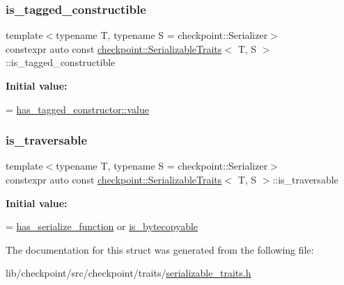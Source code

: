 \subsubsection{\texorpdfstring{is\+\_\+tagged\+\_\+constructible}{is\_tagged\_constructible}}
{\footnotesize\ttfamily template$<$typename T, typename S = checkpoint\+::\+Serializer$>$ \\
constexpr auto const \hyperlink{structcheckpoint_1_1_serializable_traits}{checkpoint\+::\+Serializable\+Traits}$<$ T, S $>$\+::is\+\_\+tagged\+\_\+constructible\hspace{0.3cm}{\ttfamily [static]}}

{\bfseries Initial value\+:}
\begin{DoxyCode}
=
    \hyperlink{structdetection_1_1detector_a6d7d0e1bdf5903db9edbe448edccf83b}{has\_tagged\_constructor::value}
\end{DoxyCode}
\mbox{\label{structcheckpoint_1_1_serializable_traits_a426639501cd0ce23cb14c7b2ff982fc1}} 
\subsubsection{\texorpdfstring{is\+\_\+traversable}{is\_traversable}}
{\footnotesize\ttfamily template$<$typename T, typename S = checkpoint\+::\+Serializer$>$ \\
constexpr auto const \hyperlink{structcheckpoint_1_1_serializable_traits}{checkpoint\+::\+Serializable\+Traits}$<$ T, S $>$\+::is\+\_\+traversable\hspace{0.3cm}{\ttfamily [static]}}

{\bfseries Initial value\+:}
\begin{DoxyCode}
=
    \hyperlink{structcheckpoint_1_1_serializable_traits_a4d17a7627a8e033cccb5cf4e6b8fd0dc}{has\_serialize\_function} or \hyperlink{structcheckpoint_1_1_serializable_traits_a19e58ea0f510be10502e476258ed14ae}{is\_bytecopyable}
\end{DoxyCode}


The documentation for this struct was generated from the following file\+:\begin{DoxyCompactItemize}
\item 
lib/checkpoint/src/checkpoint/traits/\hyperlink{serializable__traits_8h}{serializable\+\_\+traits.\+h}\end{DoxyCompactItemize}
